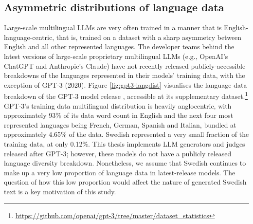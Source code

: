 \documentclass[thesis]{cluu}
\begin{document}
\subsection{Asymmetric distributions of language data}
Large-scale multilingual LLMs are very often trained in a manner that is English-language-centric, that is, trained on a dataset with a sharp asymmetry between English and all other represented languages. The developer teams behind the latest versions of large-scale proprietary multilingual LLMs (e.g., OpenAI's ChatGPT and Anthropic's Claude) have not recently released publicly-accessible breakdowns of the languages represented in their models' training data, with the exception of GPT-3 (2020). Figure \ref{fig:gpt3-langdist} visualises the language data breakdown of the GPT-3 model release \parencite{brown2020language}, accessible at its supplementary dataset.\footnote{\url{https://github.com/openai/gpt-3/tree/master/dataset_statistics}} GPT-3's training data multilingual distribution is heavily anglocentric, with approximately 93\% of its data word count in English and the next four most represented languages being French, German, Spanish and Italian, bundled at approximately 4.65\% of the data. Swedish represented a very small fraction of the training data, at only 0.12\%. This thesis implements LLM generators and judges released after GPT-3; however, these models do not have a publicly released language diversity breakdown. Nonetheless, we assume that Swedish continues to make up a very low proportion of language data in latest-release models. The question of how this low proportion would affect the nature of generated Swedish text is a key motivation of this study.

\end{document}
